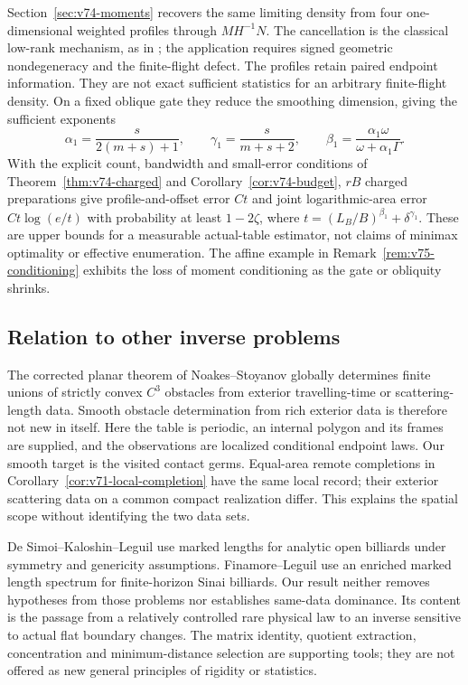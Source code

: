 Section~\ref{sec:v74-moments} recovers the same limiting density from
four one-dimensional weighted profiles through $MH^{-1}N$.
The cancellation is the classical low-rank mechanism, as in
\cite{HammHuang2019}; the application requires signed geometric
nondegeneracy and the finite-flight defect.  The profiles retain paired
endpoint information.  They are not exact sufficient statistics for an
arbitrary finite-flight density.  On a fixed oblique gate they reduce
the smoothing dimension, giving the sufficient exponents
\[
 \alpha_1=\frac{s}{2(m+s)+1},\qquad
 \gamma_1=\frac{s}{m+s+2},\qquad
 \beta_1=\frac{\alpha_1\omega}{\omega+\alpha_1\Gamma}.
\]
With the explicit count, bandwidth and small-error conditions of
Theorem~\ref{thm:v74-charged} and Corollary~\ref{cor:v74-budget},
$rB$ charged preparations give profile-and-offset error $Ct$ and joint
logarithmic-area error $Ct\log(e/t)$ with probability at least
$1-2\zeta$, where $t=(L_B/B)^{\beta_1}+\delta^{\gamma_1}$.
These are upper bounds for a measurable actual-table estimator, not
claims of minimax optimality or effective enumeration.
The affine example in Remark~\ref{rem:v75-conditioning} exhibits the
loss of moment conditioning as the gate or obliquity shrinks.

\subsection{Relation to other inverse problems}
\label{sec:v71-lens-comparison}

The corrected planar theorem of Noakes--Stoyanov
\cite{NoakesStoyanov2020} globally determines finite unions of strictly
convex $C^3$ obstacles from exterior travelling-time or scattering-length
data.  Smooth obstacle determination from rich exterior data is therefore
not new in itself.  Here the table is periodic, an internal polygon and
its frames are supplied, and the observations are localized conditional
endpoint laws.  Our smooth target is the visited contact germs.
Equal-area remote completions in
Corollary~\ref{cor:v71-local-completion} have the same local record;
their exterior scattering data on a common compact realization differ.
This explains the spatial scope without identifying the two data sets.

De Simoi--Kaloshin--Leguil \cite{DSKL} use marked lengths for analytic
open billiards under symmetry and genericity assumptions.
Finamore--Leguil \cite{FinamoreLeguil} use an enriched marked length
spectrum for finite-horizon Sinai billiards.  Our result neither removes
hypotheses from those problems nor establishes same-data dominance.
Its content is the passage from a relatively controlled rare physical
law to an inverse sensitive to actual flat boundary changes.
The matrix identity, quotient extraction, concentration and
minimum-distance selection are supporting tools; they are not offered
as new general principles of rigidity or statistics.

